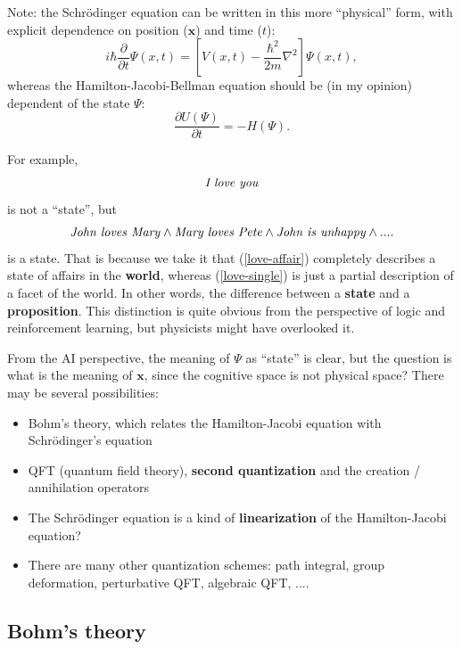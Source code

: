\documentclass[orivec]{llncs}
\newcommand{\vect}[1]{\boldsymbol{#1}}
\newcommand{\english}[1]{\mbox{\textit{#1}}}
\begin{document}
Note:  the Schr\"{o}dinger equation can be written in this more ``physical'' form, with explicit dependence on position ($\vect{x}$) and time ($t$):
\begin{equation}
i  \hbar \frac{\partial}{\partial t} \Psi(x,t) = \left[ V(x,t) - \frac{\hbar^2}{2 m} \nabla^2 \right] \Psi(x,t) ,
\end{equation}
whereas the Hamilton-Jacobi-Bellman equation should be (in my opinion) dependent of the state $\Psi$:
\begin{equation}
\frac{\partial U(\Psi)}{\partial t} = - H(\Psi) .
\end{equation}

For example,
\begin{equation}
\english{I love you}
\label{love-single}
\end{equation}
is not a ``state'', but
\begin{equation}
\english{John loves Mary} \wedge \english{Mary loves Pete} \wedge \english{John is unhappy} \wedge ....
\label{love-affair}
\end{equation}
is a state.  That is because we take it that (\ref{love-affair}) completely describes a state of affairs in the \textbf{world}, whereas (\ref{love-single}) is just a partial description of a facet of the world.  In other words, the difference between a \textbf{state} and a \textbf{proposition}.  This distinction is quite obvious from the perspective of logic and reinforcement learning, but physicists might have overlooked it.

From the AI perspective, the meaning of $\Psi$ as ``state'' is clear, but the question is what is the meaning of $\vect{x}$, since the cognitive space is not physical space?  There may be several possibilities:
\let\labelitemi\labelitemii
\begin{itemize}
	\item Bohm's theory, which relates the Hamilton-Jacobi equation with Schr\"odinger's equation
	\item QFT (quantum field theory), \textbf{second quantization} and the creation / annihilation operators
	\item The Schr\"odinger equation is a kind of \textbf{linearization} of the Hamilton-Jacobi equation?
	\item There are many other quantization schemes:  path integral, group deformation, perturbative QFT, algebraic QFT, ....
\end{itemize}

\subsection{Bohm's theory}
\end{document}
